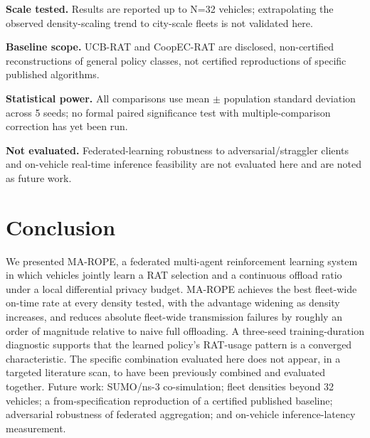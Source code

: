 \documentclass[10pt,twocolumn]{article}
\begin{document}
\textbf{Scale tested.} Results are reported up to N=32 vehicles; extrapolating the observed
density-scaling trend to city-scale fleets is not validated here.

\textbf{Baseline scope.} UCB-RAT and CoopEC-RAT are disclosed, non-certified reconstructions of
general policy classes, not certified reproductions of specific published algorithms.

\textbf{Statistical power.} All comparisons use mean $\pm$ population standard deviation across 5
seeds; no formal paired significance test with multiple-comparison correction has yet been run.

\textbf{Not evaluated.} Federated-learning robustness to adversarial/straggler clients and
on-vehicle real-time inference feasibility are not evaluated here and are noted as future work.

\section{Conclusion}
We presented MA-ROPE, a federated multi-agent reinforcement learning system in which vehicles
jointly learn a RAT selection and a continuous offload ratio under a local differential privacy
budget. MA-ROPE achieves the best fleet-wide on-time rate at every density tested, with the
advantage widening as density increases, and reduces absolute fleet-wide transmission failures by
roughly an order of magnitude relative to naive full offloading. A three-seed training-duration
diagnostic supports that the learned policy's RAT-usage pattern is a converged characteristic. The
specific combination evaluated here does not appear, in a targeted literature scan, to have been
previously combined and evaluated together. Future work: SUMO/ns-3 co-simulation; fleet densities
beyond 32 vehicles; a from-specification reproduction of a certified published baseline;
adversarial robustness of federated aggregation; and on-vehicle inference-latency measurement.



\end{document}
